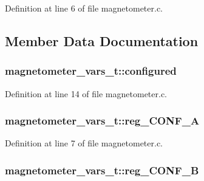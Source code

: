 Definition at line 6 of file magnetometer.\+c.



\subsection{Member Data Documentation}
\subsubsection[{\texorpdfstring{configured}{configured}}]{ magnetometer\+\_\+vars\+\_\+t\+::configured}\hypertarget{structmagnetometer__vars__t_ab5fc3257561c93ec453ec733433ee1b1}{}\label{structmagnetometer__vars__t_ab5fc3257561c93ec453ec733433ee1b1}


Definition at line 14 of file magnetometer.\+c.

\subsubsection[{\texorpdfstring{reg\+\_\+\+C\+O\+N\+F\+\_\+A}{reg_CONF_A}}]{ magnetometer\+\_\+vars\+\_\+t\+::reg\+\_\+\+C\+O\+N\+F\+\_\+A}\hypertarget{structmagnetometer__vars__t_a988937885a1fc35f3d454acd05987bec}{}\label{structmagnetometer__vars__t_a988937885a1fc35f3d454acd05987bec}


Definition at line 7 of file magnetometer.\+c.

\subsubsection[{\texorpdfstring{reg\+\_\+\+C\+O\+N\+F\+\_\+B}{reg_CONF_B}}]{ magnetometer\+\_\+vars\+\_\+t\+::reg\+\_\+\+C\+O\+N\+F\+\_\+B}\hypertarget{structmagnetometer__vars__t_a4cdcd8544a6f114ce176e8885cce3735}{}\label{structmagnetometer__vars__t_a4cdcd8544a6f114ce176e8885cce3735}


